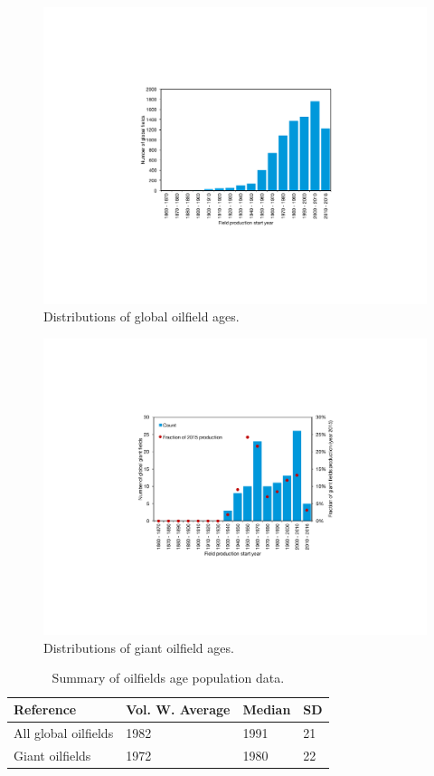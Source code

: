 \documentclass[11pt]{report}
\begin{document}
\begin{figure}[t]
\includegraphics[width=0.85\columnwidth]{images/age_distribution_all.pdf}
\caption{Distributions of global oilfield ages.}
\label{fig:age_distribution_all}
\end{figure}

\begin{figure}[t]
\includegraphics[width=0.85\columnwidth]{images/age_distribution_giant.pdf}
\caption{Distributions of giant oilfield ages.}
\label{fig:age_distribution_giant}
\end{figure}

\begin{table}
\begin{scriptsize}
\caption{Summary of oilfields age population data.}
\label{tab:oilfield_age}
\begin{tabular*}{0.8\columnwidth}{p{}p{}p{}p{}}
\toprule
Reference & Vol. W. Average & Median & SD \\
\midrule
All global oilfields & 1982 & 1991 & 21 \\
Giant oilfields & 1972 & 1980 & 22 \\
\bottomrule
\end{tabular*}
\end{scriptsize}
\end{table}
\end{document}
